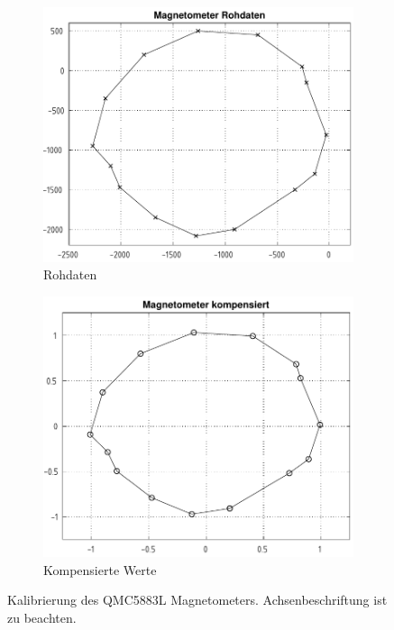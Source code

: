             \begin{figure}[H]
                \centering
                \begin{subfigure}[t]{.48\textwidth}
                    \centering
                    \includegraphics[width=\textwidth]{./img/qmc5883_raw.pdf}
                    \caption{Rohdaten}
                \end{subfigure}
                \begin{subfigure}[t]{.48\textwidth}
                    \includegraphics[width=\textwidth]{./img/qmc5883_compensated.pdf}
                    \caption{Kompensierte Werte}
                \end{subfigure}
                \caption{Kalibrierung des QMC5883L Magnetometers. Achsenbeschriftung ist zu beachten.}
                \label{fig:qmc_cal}
            \end{figure}
        

